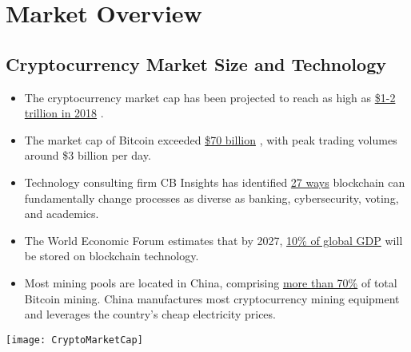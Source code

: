 \documentclass[11pt,fleqn]{book} %
\begin{document}
\section{Market Overview}
	\subsection{Cryptocurrency Market Size and Technology}
		\begin{itemize}
			\item The cryptocurrency market cap has been projected to reach as high as 
			\href{https://www.ccn.com/cryptocurrency-market-cap-to-reach-2-trillion-in-2018-mike-novogratz/}{\$1-2 trillion in 2018}
			\cite{novograzPrediction}.
			\item The market cap of Bitcoin exceeded \href{https://coinmarketcap.com/currencies/bitcoin/historical-data/}{\$70 billion}
			\cite{coinmarketcapHistorical}, 
			with peak trading volumes around \$3 billion per day.
			\item Technology consulting firm CB Insights has identified \href{https://www.cbinsights.com/blog/industries-disrupted-blockchain/}{27 ways} 
			\cite{cbinsights} blockchain can fundamentally change processes as diverse as banking, cybersecurity, voting, and academics.
			\item The World Economic Forum estimates that by 2027, 
			\href{http://www3.weforum.org/docs/WEF_GAC15_Technological_Tipping_Points_report_2015.pdf}{10\% of global GDP} \cite{wefTTP} 
			will be stored on blockchain technology.
			\item Most mining pools are located in China, comprising 
			\href{https://www.buybitcoinworldwide.com/mining/china/}{more than 70\%} \cite{bitcoinMiningChina}
			of total Bitcoin mining. China manufactures most cryptocurrency mining equipment and leverages the country’s cheap electricity prices.
		\end{itemize}
		\begin{center}
			\texttt{[image: CryptoMarketCap]}
		\end{center}
\end{document}
